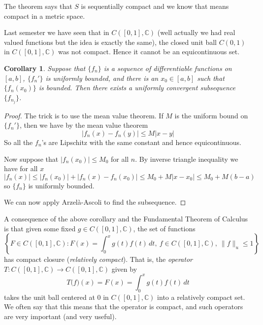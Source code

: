 \documentclass[12pt]{book}
\newcommand{\snorm}[1]{\lVert {#1} \rVert}
\newcommand{\abs}[1]{\left\lvert {#1} \right\rvert}
\newcommand{\C}{{\mathbb{C}}}
\theoremstyle{plain}
\newtheorem{cor}[thm]{Corollary}
\theoremstyle{remark}
\theoremstyle{definition}
\theoremstyle{exercise}
\theoremstyle{example}
\begin{document}
The theorem says that $S$
is sequentially compact and we know that means
compact in a metric space.

Last semester we have seen that in $C([0,1],\C)$ (well actually we had real
valued functions but the idea is exactly the same), the closed unit ball
$C(0,1)$ in $C([0,1],\C)$ was not compact.  Hence it cannot be an
equicontinuous set.

\begin{cor}
Suppose that $\{ f_n \}$ is a sequence of differentiable functions on $[a,b]$,
$\{ f_n' \}$ is uniformly bounded, and there is an
$x_0 \in [a,b]$ such that $\{ f_n(x_0) \}$ is bounded.
Then there exists a uniformly convergent
subsequence $\{ f_{n_j} \}$.
\end{cor}

\begin{proof}
The trick is to use the mean value theorem.  If $M$ is the uniform bound on
$\{ f_n' \}$, then we have by the mean value theorem
\begin{equation*}
\abs{f_n(x)-f_n(y)} \leq M \abs{x-y}
\end{equation*}
So all the $f_n$'s are Lipschitz with the same constant and hence
equicontinuous.

Now suppose that $\abs{f_n(x_0)} \leq M_0$ for all $n$.
By inverse triangle inequality we have for all $x$
$$
\abs{f_n(x)} \leq \abs{f_n(x_0)}+ \abs{f_n(x)-f_n(x_0)} \leq M_0+ M \abs{x-x_0}
\leq M_0 + M(b-a)
$$
so $\{ f_n \}$ is uniformly bounded.

We can now apply Arzel\`a-Ascoli to find the subsequence.
\end{proof}

A consequence of the above corollary and the Fundamental Theorem of Calculus
is that given some fixed $g \in
C([0,1],\C)$,
the set of functions
\begin{equation*}
\left\{
F \in C([0,1],\C) : F(x) = \int_0^x g(t) f(t)\,dt,~ f \in C([0,1],\C),~
\snorm{f}_u \leq 1
\right\}
\end{equation*}
has compact closure (\emph{relatively compact}).
That is, the \emph{operator} $T \colon C([0,1],\C) \to C([0,1],\C)$ given by
\begin{equation*}
T\bigl(f\bigr) (x) = F(x) = \int_0^x g(t) f(t)\,dt
\end{equation*}
takes the unit ball centered at 0 in $C([0,1],\C)$ into a relatively compact set.  We often
say that this means that the operator is compact, and such operators are very
important (and very useful).
\end{document}
